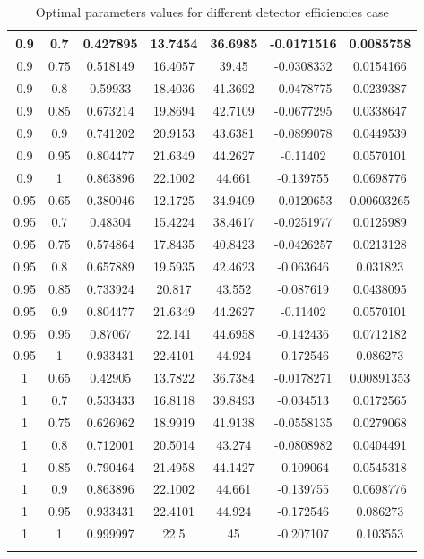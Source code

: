 \documentclass[11pt]{article}
\begin{document}
\begin{longtable}{|c|c|c|c|c|c|c|}
0.9 & 0.7 & 0.427895 & 13.7454 & 36.6985 & -0.0171516 & 0.0085758\\\hline
0.9 & 0.75 & 0.518149 & 16.4057 & 39.45 & -0.0308332 & 0.0154166\\\hline
0.9 & 0.8 & 0.59933 & 18.4036 & 41.3692 & -0.0478775 & 0.0239387\\\hline
0.9 & 0.85 & 0.673214 & 19.8694 & 42.7109 & -0.0677295 & 0.0338647\\\hline
0.9 & 0.9 & 0.741202 & 20.9153 & 43.6381 & -0.0899078 & 0.0449539\\\hline
0.9 & 0.95 & 0.804477 & 21.6349 & 44.2627 & -0.11402 & 0.0570101\\\hline
0.9 & 1 & 0.863896 & 22.1002 & 44.661 & -0.139755 & 0.0698776\\\hline
0.95 & 0.65 & 0.380046 & 12.1725 & 34.9409 & -0.0120653 & 0.00603265\\\hline
0.95 & 0.7 & 0.48304 & 15.4224 & 38.4617 & -0.0251977 & 0.0125989\\\hline
0.95 & 0.75 & 0.574864 & 17.8435 & 40.8423 & -0.0426257 & 0.0213128\\\hline
0.95 & 0.8 & 0.657889 & 19.5935 & 42.4623 & -0.063646 & 0.031823\\\hline
0.95 & 0.85 & 0.733924 & 20.817 & 43.552 & -0.087619 & 0.0438095\\\hline
0.95 & 0.9 & 0.804477 & 21.6349 & 44.2627 & -0.11402 & 0.0570101\\\hline
0.95 & 0.95 & 0.87067 & 22.141 & 44.6958 & -0.142436 & 0.0712182\\\hline
0.95 & 1 & 0.933431 & 22.4101 & 44.924 & -0.172546 & 0.086273\\\hline
1 & 0.65 & 0.42905 & 13.7822 & 36.7384 & -0.0178271 & 0.00891353\\\hline
1 & 0.7 & 0.533433 & 16.8118 & 39.8493 & -0.034513 & 0.0172565\\\hline
1 & 0.75 & 0.626962 & 18.9919 & 41.9138 & -0.0558135 & 0.0279068\\\hline
1 & 0.8 & 0.712001 & 20.5014 & 43.274 & -0.0808982 & 0.0404491\\\hline
1 & 0.85 & 0.790464 & 21.4958 & 44.1427 & -0.109064 & 0.0545318\\\hline
1 & 0.9 & 0.863896 & 22.1002 & 44.661 & -0.139755 & 0.0698776\\\hline
1 & 0.95 & 0.933431 & 22.4101 & 44.924 & -0.172546 & 0.086273\\\hline
1 & 1 & 0.999997 & 22.5 & 45 & -0.207107 & 0.103553\\\hline
\caption{Optimal parameters values for different detector efficiencies case}
\label{tab:different_etas}
\end{longtable}
\end{document}
